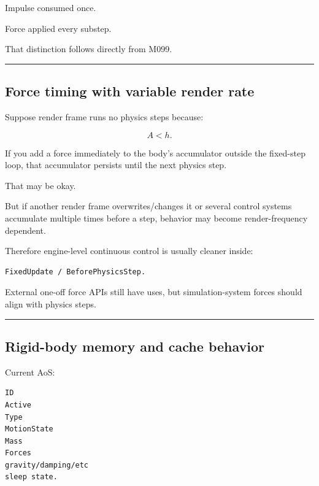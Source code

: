 Impulse consumed once.

Force applied every substep.

That distinction follows directly from M099.

\begin{center}\rule{0.5\linewidth}{0.5pt}\end{center}

\subsection{Force timing with variable render rate}\label{06-engine-ii-ch038-force-timing-with-variable-render-rate}

\hypertarget{06-engine-ii-ch038-force-timing-with-variable-render-rate}{}

Suppose render frame runs no physics steps because:

\[
A<h.
\]

If you add a force immediately to the body's accumulator outside the fixed-step loop, that accumulator persists until the next physics step.

That may be okay.

But if another render frame overwrites/changes it or several control systems accumulate multiple times before a step, behavior may become render-frequency dependent.

Therefore engine-level continuous control is usually cleaner inside:

\begin{verbatim}
FixedUpdate / BeforePhysicsStep.
\end{verbatim}

External one-off force APIs still have uses, but simulation-system forces should align with physics steps.

\begin{center}\rule{0.5\linewidth}{0.5pt}\end{center}

\subsection{Rigid-body memory and cache behavior}\label{06-engine-ii-ch038-rigid-body-memory-and-cache-behavior}

\hypertarget{06-engine-ii-ch038-rigid-body-memory-and-cache-behavior}{}

Current AoS:

\begin{verbatim}
ID
Active
Type
MotionState
Mass
Forces
gravity/damping/etc
sleep state.
\end{verbatim}

